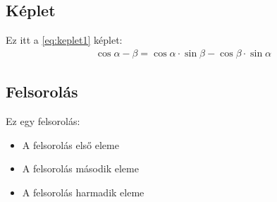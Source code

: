 	
\subsection{Képlet}

Ez itt a \ref{eq:keplet1} képlet:
\begin{align}
    \cos{\alpha-\beta} = \cos{\alpha}\cdot\sin{\beta}-\cos{\beta}\cdot\sin{\alpha}
    \label{eq:keplet1}
\end{align}	

	
\subsection{Felsorolás}

Ez egy felsorolás:
\begin{itemize}
	\item A felsorolás első eleme
	\item A felsorolás második eleme
	\item A felsorolás harmadik eleme
\end{itemize}